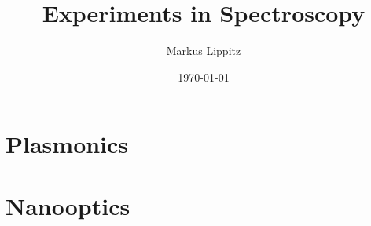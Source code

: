 \documentclass[notoc,nofonts,a4paper,twoside,nobib]{tufte-book}
\renewcommand{\chaptername}{Chapter\ }
\begin{document}
  \tikzexternaldisable


\title{Experiments in Spectroscopy}

\author{Markus Lippitz}
\date{\today}


\maketitle


%
\tableofcontents

%
%
%
%
%
%
%
%
%
%
%
%
%
%
%
%
%
%

\part{Plasmonics}







\part{Nanooptics}




%
\renewcommand{\chaptername}{Appendix\ }

\appendix
\appendixpage

%
%




\printbibliography
\end{document}
